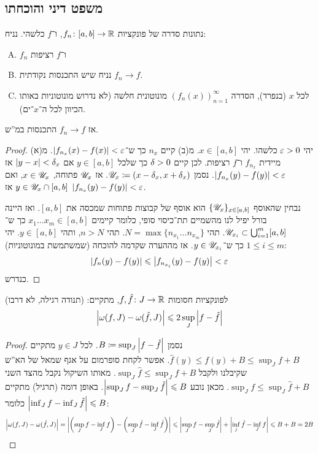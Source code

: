 \documentclass[name=רשימות חדו''א 2א]{../../../tex/classes/noChapterMegasumPreamble}
\begin{document}
\subsection{משפט דיני והוכחתו}
	\begin{Theorem}[דיני]
		נתונות סדרה של פונקציות $f_n \colon [a, b] \to \mathbb{R}$, ו־$f$ כלשהי. נניח:
		\begin{enumerate}[(A)]
			\item $f_n$ ו־$f$ רציפות
			\item נניח שיש התכנסות נקודתית $f_n \to f$.
			\item לכל $x$ (בנפרד), הסדרה $(f_n(x))_{n = 1}^{\infty}$ מונוטונית חלשה (לא נדרוש מונוטוניות באותו הכיוון לכל ה־$x$־ים).
		\end{enumerate}
		אז $f_n \to f$ התכנסות במ''ש.
	\end{Theorem}
	\begin{proof}
		יהי $\eg > 0$ כלשהו. יהי $x \in [a, b]$. מ(ב) קיים $n_x$ כך ש־$\sof{f_{n_x}(x) - f(x)} < \eg$. מ(א) מיידית $f_{n_x}$ ו־$f$ רציפות. לכן קיים $\delta > 0$ כך שלכל $y \in [a, b]$ אם $\left \lvert y - x \right \rvert  < \delta_x$ אז $\sof{f_{n_x}(y) - f(y)} < \eg$. נסמן $\mathscr{U}_x \coloneqq (x -\delta_x, x + \delta_x)$. אז $\mathscr{U}_x$ פתוחה, $x \in \mathscr{U}_x$, ואם $y \in \mathscr{U}_x \cap [a, b]$ אז $\sof{f_{n_x}(y) - f(y)} < \eg$.

		נבחין שהאוסף $\{\mathscr{U}_x\}_{x \in [a, b]}$ הוא אוסף של קבוצות פתוחות שמכסה את $[a, b]$. ואז היינה בורל יפיל לנו מהשמיים תת־כיסוי סופי, כלומר קיימים $x_1 \dots x_m \in [a, b]$ כך ש־$\mathscr{U}_{x_i} \subset \bigcup_{i = 1}^{m}[a, b]$. תהי $N = \max\{n_{x_1} \dots n_{x_m}\}$. תהי $n > N$, ותהי $y \in [a, b]$. יהי $1 \le i \le m$ כך ש־$y \in \mathscr{U}_{x_i}$. אז מההערה שקדמה להוכחה (שמשתמשת במונוטוניות):
		\[ \sof{f_n(y) - f(y)} \le \sof{f_{n_{x_i}}(y) - f(y)} < \eg \]
		כנדרש.
	\end{proof}

	\begin{Lemma}
		לפונקציות חסומות $f, \hat f \colon J \to \mathbb{R}$, מתקיים: (תנודה רגילה, לא דרבו)
		\[ \left \lvert \omega(f, J) - \omega(\hat f, J) \right \rvert \leqslant 2 \sup_J \left \lvert f - \hat f \right \rvert \]
	\end{Lemma}\begin{proof}
		נסמן $B \coloneqq \sup_J\left \lvert f - \hat f \right \rvert$. לכל $y \in J$ מתקיים $\hat f(y) \le f(y) + B \le \sup_J f + B$. אפשר לקחת סופרמום על אגף שמאל של הא''ש שקיבלנו ולקבל $\sup_J \hat f \le \sup_J f + B$. מאותו השיקול נקבל מהצד השני $\sup_J f \le \sup_J \hat f + B$. מכאן נובע $\left \lvert \sup_J f - \sup _J \hat f \right \rvert \leqslant B$. באופן דומה (תרגיל) מתקיים $\left \lvert \inf_J f - \inf_J \hat f \right \rvert \leqslant B$ כלומר:
		\[ \left \lvert \omega(f, J) - \omega(\hat f, J) \right \rvert = \left \lvert \left ( \sup_Jf - \inf_Jf \right ) - \left ( \sup_J \hat f - \inf_J \hat f \right ) \right \rvert \leqslant \left \lvert \sup_J f - \sup_J \hat f \right \rvert + \left \lvert \inf_j \hat f - \inf_J f \right \rvert \leqslant B + B = 2B \]\envendproof
	\end{proof}
\end{document}
